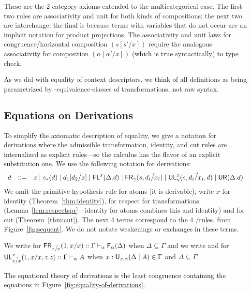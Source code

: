 \noindent These are the 2-category axioms extended to the
multicategorical case.  The first two rules are associativity and unit
for both kinds of compositions; the next two are interchange; the final
is because terms with variables that do not occur are an implicit
notation for product projections.  The associativity and unit laws for
congruence/horizontal composition $(s[s'/x])$ require the analogous
associativity for composition $(\alpha[\alpha'/x])$ (which is true
syntactically) to type check.

As we did with equality of context descriptors, we think of all
definitions as being parametrized by \deq-equivalence-classes of
transformations, not raw syntax.

\subsection{Equations on Derivations}

To simplify the axiomatic description of equality, we give a notation
for derivations where the admissible
transformation, identity, and cut rules are internalized as explicit
rules---so the calculus has the flavor of an explicit substitution one.
We use the following notation for derivations:
\[
\begin{array}{rcl}
d & ::= & {x} \mid s_*(d) \mid d_1[d_2/x] \mid
 \mathsf{FL}^{x}(\Delta.d) \mid \mathsf{FR}_{\gamma}(s,\vec{d_i/x_i}) \mid \mathsf{UL}^{x}_{\gamma}(s,\vec{d_i/x_i},d) \mid \mathsf{UR}(\Delta.d) 
\end{array}
\]
We omit the primitive hypothesis rule for atoms (it is derivable),
write $x$ for identity (Theorem~\ref{thm:identity}),  for
respect for transformations (Lemma~\ref{lem:respectspr}---identity for
atoms combines this and identity) and  for cut
(Theorem~\ref{thm:cut}).  The next 4 terms correspond to the 4
\Usymb/\Fsymb rules.  from Figure~\ref{fig:sequent}.  
We do not notate weakenings or exchanges in these terms.

We write \FRs\/ for $\mathsf{FR}_{\vec{x/x}}(1,{x}/x) ::
\Gamma \vdash_{\alpha} \mathsf{F}_{\alpha}(\Delta)$ when $\Delta \subseteq \Gamma$
and we write and  for $\mathsf{UL}^{x}_{\vec{x/x}}(1,{x}/x,z.z) ::
\Gamma \vdash_{\alpha} A$ when $x:\mathsf{U}_{x.\alpha}(\Delta \mid A) \in \Gamma$ and
$\Delta \subseteq \Gamma$.  

The equational theory of derivations is the least congruence containing
the equations in Figure~\ref{fig:equality-of-derivations}.

